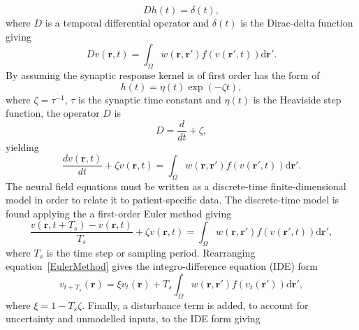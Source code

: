 \documentclass[]{article}
\begin{document}
\begin{equation}
	\label{GreensFuncDef} Dh\left( t \right) = \delta \left( t \right), 
\end{equation}
where $D$ is a temporal differential operator and $\delta(t)$ is the Dirac-delta function giving 
\begin{equation}
	\label{FinalFormContinuous} 
	Dv\left( \mathbf{r},t \right) = \int_\Omega {w\left( \mathbf{r},\mathbf{r}' \right)f\left( {v\left( \mathbf{r}',t \right)} \right)\textrm{d}\mathbf{r}'}. 
\end{equation}
By assuming the synaptic response kernel is of first order has the form of
\begin{equation}
	\label{SynapticRespKernel} h(t) = \eta(t)\exp{\left(-\zeta t\right)}, 
\end{equation}
where $\zeta=\tau^{-1}$, $\tau$ is the synaptic time constant and $\eta(t)$ is the Heaviside step function, the operator $D$ is
\begin{equation}
	D=\frac{d}{dt} + \zeta,
\end{equation}
yielding
\begin{equation}
	\label{FinalFormContinuous} 
	\frac{dv\left( \mathbf{r},t \right)}{dt} + \zeta v\left( \mathbf{r},t \right) = \int_\Omega {w\left( \mathbf{r},\mathbf{r}' \right)f\left( {v\left( \mathbf{r}',t \right)} \right)\textrm{d}\mathbf{r}'}. 
\end{equation}
The neural field equations must be written as a discrete-time finite-dimensional model in order to relate it to patient-specific data. The discrete-time model is found applying the a first-order Euler method giving
\begin{equation}\label{EulerMethod}
	\frac{v\left( \mathbf{r},t+T_s \right)-v\left( \mathbf{r},t \right)}{T_s} + \zeta v\left(\mathbf{r},t \right) = \int_\Omega {w\left( \mathbf{r},\mathbf{r}' \right) f\left( {v\left( \mathbf{r}',t \right)}\right)\textrm{d}\mathbf{r}'},
\end{equation}
where $T_s$ is the time step or sampling period. Rearranging equation~\ref{EulerMethod} gives the integro-difference equation (IDE) form
\begin{equation}
	\label{DiscreteTimeModel} 
	v_{t+T_s}\left(\mathbf{r}\right) = 
	\xi v_t\left(\mathbf{r}\right) + 
	T_s \int_\Omega { 
	    w\left(\mathbf{r},\mathbf{r}'\right)
	    f\left(v_t\left(\mathbf{r}'\right)\right) 
	\textrm{d}\mathbf{r}'}, 
\end{equation}
where $\xi = 1-T_s\zeta$. Finally, a disturbance term is added, to account for uncertainty and unmodelled inputs, to the IDE form giving
\end{document}
